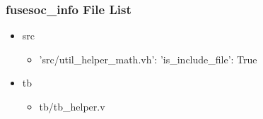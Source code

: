 \subsubsection{fusesoc\_info File List}
\begin{itemize}
\item src
	\begin{itemize}
	\item {'src/util\_helper\_math.vh': {'is\_include\_file': True}}
	\end{itemize}
\item tb
	\begin{itemize}
	\item tb/tb\_helper.v
	\end{itemize}
\end{itemize}
